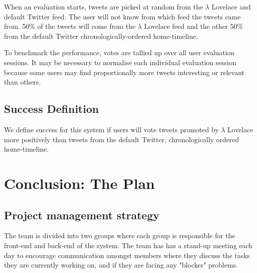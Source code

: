\documentclass{article}
\begin{document}
When an evaluation starts, tweets are picked at random from the $\lambda$ Lovelace and default Twitter feed. The user will not know from which feed the tweets came from. 50\% of the tweets will come from the $\lambda$ Lovelace feed and the other 50\% from the default Twitter chronologically-ordered home-timeline.

To benchmark the performance, votes are tallied up over all user evaluation sessions. It may be necessary to normalise each individual evaluation session because some users may find proportionally more tweets interesting or relevant than others.

\subsection{Success Definition}
We define success for this system if users will vote tweets promoted by $\lambda$ Lovelace more positively than tweets from the default Twitter, chronologically ordered home-timeline.


\newpage


\section{Conclusion: The Plan}
%
%
%
\subsection{Project management strategy}
The team is divided into two groups where each group is responsible for the front-end and back-end of the system. The team has has a stand-up meeting each day to encourage communication amongst members where they discuss the tasks they are currently working on, and if they are facing any "blocker" problems.
\end{document}
